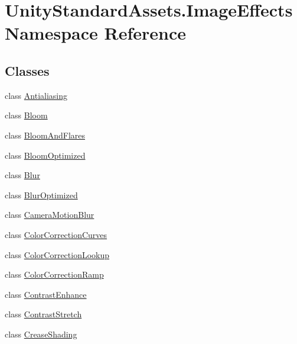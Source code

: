 \hypertarget{namespace_unity_standard_assets_1_1_image_effects}{}\section{Unity\+Standard\+Assets.\+Image\+Effects Namespace Reference}
\label{namespace_unity_standard_assets_1_1_image_effects}
\subsection*{Classes}
\begin{DoxyCompactItemize}
\item 
class \hyperlink{class_unity_standard_assets_1_1_image_effects_1_1_antialiasing}{Antialiasing}
\item 
class \hyperlink{class_unity_standard_assets_1_1_image_effects_1_1_bloom}{Bloom}
\item 
class \hyperlink{class_unity_standard_assets_1_1_image_effects_1_1_bloom_and_flares}{Bloom\+And\+Flares}
\item 
class \hyperlink{class_unity_standard_assets_1_1_image_effects_1_1_bloom_optimized}{Bloom\+Optimized}
\item 
class \hyperlink{class_unity_standard_assets_1_1_image_effects_1_1_blur}{Blur}
\item 
class \hyperlink{class_unity_standard_assets_1_1_image_effects_1_1_blur_optimized}{Blur\+Optimized}
\item 
class \hyperlink{class_unity_standard_assets_1_1_image_effects_1_1_camera_motion_blur}{Camera\+Motion\+Blur}
\item 
class \hyperlink{class_unity_standard_assets_1_1_image_effects_1_1_color_correction_curves}{Color\+Correction\+Curves}
\item 
class \hyperlink{class_unity_standard_assets_1_1_image_effects_1_1_color_correction_lookup}{Color\+Correction\+Lookup}
\item 
class \hyperlink{class_unity_standard_assets_1_1_image_effects_1_1_color_correction_ramp}{Color\+Correction\+Ramp}
\item 
class \hyperlink{class_unity_standard_assets_1_1_image_effects_1_1_contrast_enhance}{Contrast\+Enhance}
\item 
class \hyperlink{class_unity_standard_assets_1_1_image_effects_1_1_contrast_stretch}{Contrast\+Stretch}
\item 
class \hyperlink{class_unity_standard_assets_1_1_image_effects_1_1_crease_shading}{Crease\+Shading}

\end{DoxyCompactItemize}
